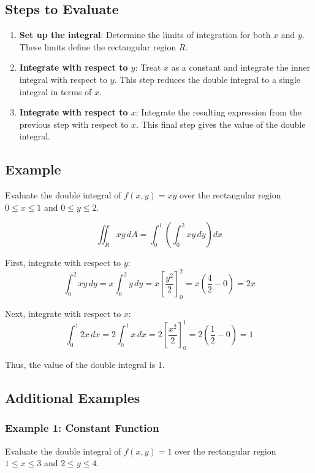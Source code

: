 \documentclass{article}
\begin{document}
\subsection*{Steps to Evaluate}
\begin{enumerate}
    \item \textbf{Set up the integral}: Determine the limits of integration for both \( x \) and \( y \). These limits define the rectangular region \( R \).
    \item \textbf{Integrate with respect to \( y \)}: Treat \( x \) as a constant and integrate the inner integral with respect to \( y \). This step reduces the double integral to a single integral in terms of \( x \).
    \item \textbf{Integrate with respect to \( x \)}: Integrate the resulting expression from the previous step with respect to \( x \). This final step gives the value of the double integral.
\end{enumerate}

\subsection*{Example}
Evaluate the double integral of \( f(x, y) = xy \) over the rectangular region \( 0 \leq x \leq 1 \) and \( 0 \leq y \leq 2 \).

\[
\iint_R xy \, dA = \int_0^1 \left( \int_0^2 xy \, dy \right) dx
\]

First, integrate with respect to \( y \):
\[
\int_0^2 xy \, dy = x \int_0^2 y \, dy = x \left[ \frac{y^2}{2} \right]_0^2 = x \left( \frac{4}{2} - 0 \right) = 2x
\]

Next, integrate with respect to \( x \):
\[
\int_0^1 2x \, dx = 2 \int_0^1 x \, dx = 2 \left[ \frac{x^2}{2} \right]_0^1 = 2 \left( \frac{1}{2} - 0 \right) = 1
\]

Thus, the value of the double integral is 1.

\subsection*{Additional Examples}

\subsubsection*{Example 1: Constant Function}
Evaluate the double integral of \( f(x, y) = 1 \) over the rectangular region \( 1 \leq x \leq 3 \) and \( 2 \leq y \leq 4 \).
\end{document}
